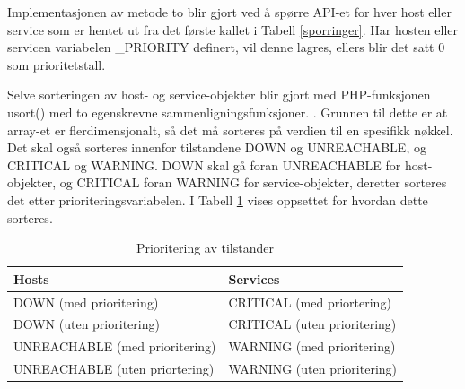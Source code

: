 Implementasjonen av metode to blir gjort ved å spørre API-et for hver host eller service som er hentet ut fra det første kallet i Tabell \ref{sporringer}. Har hosten eller servicen variabelen \_PRIORITY definert, vil denne lagres, ellers blir det satt 0 som prioritetstall.

Selve sorteringen av host- og service-objekter blir gjort med PHP-funksjonen usort() med to egenskrevne sammenligningsfunksjoner. \cite{usort}. Grunnen til dette er at array-et er flerdimensjonalt, så det må sorteres på verdien til en spesifikk nøkkel. Det skal også sorteres innenfor tilstandene DOWN og UNREACHABLE, og CRITICAL og WARNING. DOWN skal gå foran UNREACHABLE for host-objekter, og CRITICAL foran WARNING for service-objekter, deretter sorteres det etter prioriteringsvariabelen. I Tabell \ref{prioritering} vises oppsettet for hvordan dette sorteres.

\begin{table}
\begin{center}
\begin{tabular}{ | l | l |} \hline
    \textbf{Hosts} & \textbf{Services} \\ \hline
    DOWN (med prioritering) & CRITICAL (med priortering) \\ \hline
    DOWN (uten prioritering) & CRITICAL (uten prioritering) \\ \hline
    UNREACHABLE (med prioritering) & WARNING (med prioritering) \\ \hline
    UNREACHABLE (uten priortering) & WARNING (uten prioritering) \\ \hline
\end{tabular}
\caption{Prioritering av tilstander}
\label{prioritering}
\end{center}
\end{table}
